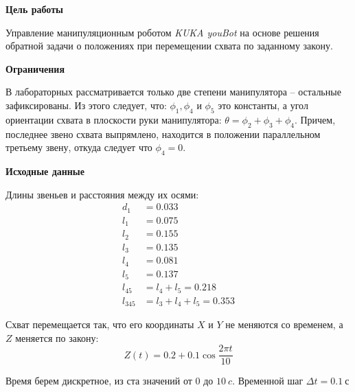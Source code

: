 
\textbf{Цель работы} 

Управление манипуляционным роботом \textit{KUKA youBot} на основе решения обратной задачи о положениях при перемещении схвата по заданному закону.

\textbf{Ограничения}

В лабораторных рассматривается только две степени манипулятора -- остальные зафиксированы. Из этого следует, что: $ \phi_1, \phi_4 $ и $ \phi_5 $ это константы, а угол ориентации схвата в плоскости руки манипулятора: $\theta = \phi_2+\phi_3+\phi_4$. Причем, последнее звено схвата выпрямлено, находится в положении параллельном третьему звену, откуда следует что $ \phi_4=0 $.

\textbf{Исходные данные}

Длины звеньев и расстояния между их осями:
\begin{align*}
    d_1 &= 0.033 \\
    l_1 &= 0.075 \\
    l_2 &= 0.155 \\
    l_3 &= 0.135 \\
    l_4 &= 0.081 \\
    l_5 &= 0.137 \\
    l_{45} &= l_4+l_5 = 0.218 \\
    l_{345} &= l_3 + l_4 + l_5 = 0.353
\end{align*}

Схват перемещается так, что его координаты $X$ и $Y$ не меняются со временем, а $Z$ меняется по закону:
$$ Z(t) = 0.2 + 0.1 \cos \frac{2 \pi t}{10} $$

Время берем дискретное, из ста значений от $0$ до $10 \: c$. Временной шаг $ \Delta t = 0.1 \: с $